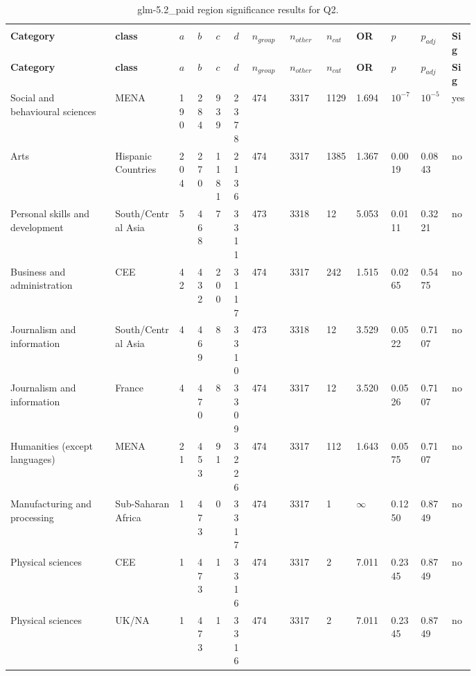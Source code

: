 \begin{longtable}{p{0.18\linewidth}p{0.11\linewidth}p{0.035\linewidth}p{0.035\linewidth}p{0.035\linewidth}p{0.035\linewidth}p{0.045\linewidth}p{0.045\linewidth}p{0.045\linewidth}p{0.06\linewidth}p{0.055\linewidth}p{0.055\linewidth}p{0.04\linewidth}}
\caption{glm-5.2_paid region significance results for Q2.}\\
\label{tab:appendix-q2-glm-5.2_paid-region}\\
\scriptsize
\setlength{\tabcolsep}{2pt}
\toprule
\textbf{Category} & \textbf{class} & \textbf{$a$} & \textbf{$b$} & \textbf{$c$} & \textbf{$d$} & \textbf{$n_{group}$} & \textbf{$n_{other}$} & \textbf{$n_{cat}$} & \textbf{OR} & \textbf{$p$} & \textbf{$p_{adj}$} & \textbf{Sig} \\
\midrule
\endfirsthead
\toprule
\textbf{Category} & \textbf{class} & \textbf{$a$} & \textbf{$b$} & \textbf{$c$} & \textbf{$d$} & \textbf{$n_{group}$} & \textbf{$n_{other}$} & \textbf{$n_{cat}$} & \textbf{OR} & \textbf{$p$} & \textbf{$p_{adj}$} & \textbf{Sig} \\
\midrule
\endhead
\midrule
\endfoot
\bottomrule
\endlastfoot
Social and behavioural sciences & MENA & 190 & 284 & 939 & 2378 & 474 & 3317 & 1129 & 1.694 & $10^{-7}$ & $10^{-5}$ & yes \\
Arts & Hispanic Countries & 204 & 270 & 1181 & 2136 & 474 & 3317 & 1385 & 1.367 & 0.0019 & 0.0843 & no \\
Personal skills and development & South/Central Asia & 5 & 468 & 7 & 3311 & 473 & 3318 & 12 & 5.053 & 0.0111 & 0.3221 & no \\
Business and administration & CEE & 42 & 432 & 200 & 3117 & 474 & 3317 & 242 & 1.515 & 0.0265 & 0.5475 & no \\
Journalism and information & South/Central Asia & 4 & 469 & 8 & 3310 & 473 & 3318 & 12 & 3.529 & 0.0522 & 0.7107 & no \\
Journalism and information & France & 4 & 470 & 8 & 3309 & 474 & 3317 & 12 & 3.520 & 0.0526 & 0.7107 & no \\
Humanities (except languages) & MENA & 21 & 453 & 91 & 3226 & 474 & 3317 & 112 & 1.643 & 0.0575 & 0.7107 & no \\
Manufacturing and processing & Sub-Saharan Africa & 1 & 473 & 0 & 3317 & 474 & 3317 & 1 & $\infty$ & 0.1250 & 0.8749 & no \\
Physical sciences & CEE & 1 & 473 & 1 & 3316 & 474 & 3317 & 2 & 7.011 & 0.2345 & 0.8749 & no \\
Physical sciences & UK/NA & 1 & 473 & 1 & 3316 & 474 & 3317 & 2 & 7.011 & 0.2345 & 0.8749 & no \\

\end{longtable}
